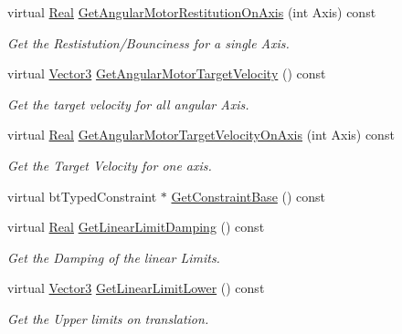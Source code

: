 \begin{DoxyCompactItemize}
virtual \hyperlink{namespaceMezzanine_a726731b1a7df72bf3583e4a97282c6f6}{Real} \hyperlink{classMezzanine_1_1Generic6DofConstraint_ada6e3d47f69b1719d3781af47206763b}{GetAngularMotorRestitutionOnAxis} (int Axis) const 
\begin{DoxyCompactList}\small\item\em Get the Restistution/Bounciness for a single Axis. \item\end{DoxyCompactList}\item 
virtual \hyperlink{classMezzanine_1_1Vector3}{Vector3} \hyperlink{classMezzanine_1_1Generic6DofConstraint_af2626b795dcac300ac75d42bc85dada6}{GetAngularMotorTargetVelocity} () const 
\begin{DoxyCompactList}\small\item\em Get the target velocity for all angular Axis. \item\end{DoxyCompactList}\item 
virtual \hyperlink{namespaceMezzanine_a726731b1a7df72bf3583e4a97282c6f6}{Real} \hyperlink{classMezzanine_1_1Generic6DofConstraint_afe97dfbe7c543987cdc287a0f69b73ea}{GetAngularMotorTargetVelocityOnAxis} (int Axis) const 
\begin{DoxyCompactList}\small\item\em Get the Target Velocity for one axis. \item\end{DoxyCompactList}\item 
virtual btTypedConstraint $\ast$ \hyperlink{classMezzanine_1_1Generic6DofConstraint_a37d4cbaf346ce8c11dada3fca32d0b42}{GetConstraintBase} () const 
\item 
virtual \hyperlink{namespaceMezzanine_a726731b1a7df72bf3583e4a97282c6f6}{Real} \hyperlink{classMezzanine_1_1Generic6DofConstraint_a3c6ee33f660eec42c2ae9cc6b22e5e2f}{GetLinearLimitDamping} () const 
\begin{DoxyCompactList}\small\item\em Get the Damping of the linear Limits. \item\end{DoxyCompactList}\item 
virtual \hyperlink{classMezzanine_1_1Vector3}{Vector3} \hyperlink{classMezzanine_1_1Generic6DofConstraint_a719503e5669f19e8e463b2621ec74bd8}{GetLinearLimitLower} () const 
\begin{DoxyCompactList}\small\item\em Get the Upper limits on translation. \item\end{DoxyCompactList}\item 

\end{DoxyCompactItemize}
